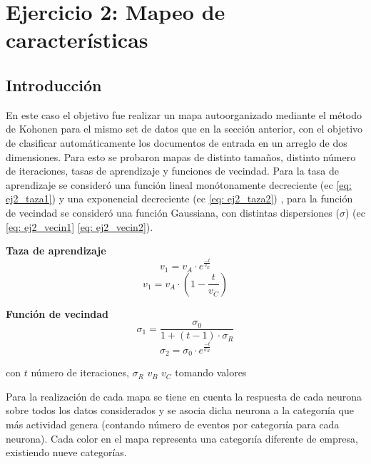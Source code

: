 \section{Ejercicio 2: Mapeo de características}

\subsection{Introducción}

\par En este caso el objetivo fue realizar un mapa auto\-organizado mediante el método de Kohonen para el mismo set de datos que en la sección anterior, con el objetivo de clasificar automáticamente los documentos de entrada en un arreglo de dos dimensiones. Para esto se probaron mapas de distinto tamaños, distinto número de iteraciones, tasas de aprendizaje y funciones de vecindad. Para la tasa de aprendizaje se consideró una función lineal monótonamente decreciente (ec \ref{eq: ej2_taza1}) y una exponencial decreciente (ec \ref{eq: ej2_taza2}) , para la función de vecindad se consideró una función Gaussiana, con distintas  dispersiones ($\sigma$) (ec \ref{eq: ej2_vecin1} \- \ref{eq: ej2_vecin2}).


\textbf{Taza de aprendizaje}
\begin{equation}
	\label{eq: ej2_taza1}
	v_1 = v_A \cdot e^{\frac{-t}{v_E}}
\end{equation}
\begin{equation}
	\label{eq: ej2_taza2}
	v_1 = v_A \cdot ( 1 - \frac{t}{v_C} )
\end{equation}

\textbf{Función de vecindad}
\begin{equation}
	\label{eq: ej2_vecin1}
	\sigma_1 = \frac{\sigma_0}{1 + (t-1) \cdot \sigma_R}
\end{equation}
\begin{equation}
	\label{eq: ej2_vecin2}
	\sigma_2 = \sigma_0 \cdot e^{\frac{-t}{\sigma_R}}
\end{equation}

con $t$ número de iteraciones, $\sigma_R$ $v_B$ $v_C$ tomando valores 

\par Para la realización de cada mapa se tiene en cuenta la respuesta de cada neurona sobre todos los datos considerados y se asocia dicha neurona a la categorıía que más actividad genera (contando número de eventos por categorıía para cada neurona). Cada color en el mapa representa una categorıía diferente de empresa, existiendo nueve categorías.

